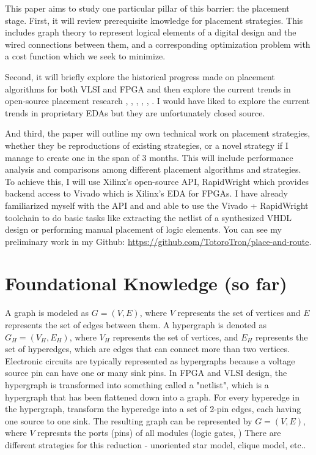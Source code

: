 \documentclass{article}
\begin{document}
    This paper aims to study one particular pillar of this barrier: the placement stage. 
    First, it will review prerequisite knowledge for placement strategies. 
    This includes graph theory to represent logical elements of a digital design and the wired connections between them, and a corresponding optimization problem with a cost function which we seek to minimize. 

    Second, it will briefly explore the historical progress made on placement algorithms for both VLSI and FPGA \cite{ProCha} and then explore the current trends in open-source placement research 
    \cite{Yosys}, \cite{AMFPlacer2}, \cite{RapidLayout}, \cite{RapidStream}, \cite{DREAMPlace}, \cite{DREAMPlaceFPGA}.
    I would have liked to explore the current trends in proprietary EDAs but they are unfortunately closed source.

    And third, the paper will outline my own technical work on placement strategies, whether they be reproductions of existing strategies, or a novel strategy if I manage to create one in the span of 3 months. 
    This will include performance analysis and comparisons among different placement algorithms and strategies.
    To achieve this, I will use Xilinx's open-source API, RapidWright which provides backend access to Vivado which is Xilinx's EDA for FPGAs. 
    I have already familiarized myself with the API and and able to use the Vivado + RapidWright toolchain to do basic tasks like extracting the netlist of a synthesized VHDL design or performing manual placement of logic elements.
    You can see my preliminary work in my Github: \url{https://github.com/TotoroTron/place-and-route}.

\section{Foundational Knowledge (so far)}
    A graph is modeled as \( G = (V, E) \), where \( V \) represents the set of vertices and \( E \) represents the set of edges between them.
    A hypergraph is denoted as \( G_{H} = (V_{H}, E_{H}) \), where \( V_{H} \) represents the set of vertices, and \( E_{H} \) represents the set of hyperedges, which are edges that can connect more than two vertices.
    Electronic circuits are typically represented as hypergraphs because a voltage source pin can have one or many sink pins. 
    In FPGA and VLSI design, the hypergraph is transformed into something called a "netlist", which is a hypergraph that has been flattened down into a graph. 
    For every hyperedge in the hypergraph, transform the hyperedge into a set of 2-pin edges, each having one source to one sink.
    The resulting graph can be represented by \( G = (V, E) \), where \( V \) represnts the ports (pins) of all modules (logic gates, )
    There are different strategies for this reduction - unoriented star model, clique model, etc.. 
    \cite{AP_2000}
\end{document}
